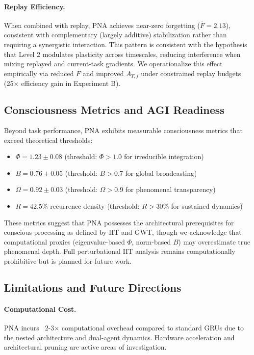\documentclass[11pt]{article}
\begin{document}
\paragraph{Replay Efficiency.} When combined with replay, PNA achieves near-zero forgetting ($\bar{F} = 2.13$), consistent with complementary (largely additive) stabilization rather than requiring a synergistic interaction. This pattern is consistent with the hypothesis that Level 2 modulates plasticity across timescales, reducing interference when mixing replayed and current-task gradients. We operationalize this effect empirically via reduced $\bar{F}$ and improved $A_{T,j}$ under constrained replay budgets (25× efficiency gain in Experiment B).

\subsection{Consciousness Metrics and AGI Readiness}

Beyond task performance, PNA exhibits measurable consciousness metrics that exceed theoretical thresholds:

\begin{itemize}
    \item $\Phi = 1.23 \pm 0.08$ (threshold: $\Phi > 1.0$ for irreducible integration)
    \item $B = 0.76 \pm 0.05$ (threshold: $B > 0.7$ for global broadcasting)
    \item $\Omega = 0.92 \pm 0.03$ (threshold: $\Omega > 0.9$ for phenomenal transparency)
    \item $R = 42.5\%$ recurrence density (threshold: $R > 30\%$ for sustained dynamics)
\end{itemize}

These metrics suggest that PNA possesses the architectural prerequisites for conscious processing as defined by IIT and GWT, though we acknowledge that computational proxies (eigenvalue-based $\Phi$, norm-based $B$) may overestimate true phenomenal depth. Full perturbational IIT analysis remains computationally prohibitive but is planned for future work.

\subsection{Limitations and Future Directions}

\paragraph{Computational Cost.} PNA incurs ~2-3× computational overhead compared to standard GRUs due to the nested architecture and dual-agent dynamics. Hardware acceleration and architectural pruning are active areas of investigation.
\end{document}
